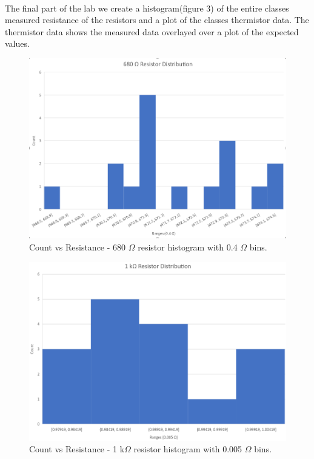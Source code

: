 \documentclass{article}
\begin{document}
\paragraph{}
The final part of the lab we create a histogram(figure 3) of the entire classes measured resistance of the resistors and a plot of the classes thermistor data. The thermistor data shows the measured data overlayed over a plot of the expected values.

\begin{figure}[H]
	\begin{center}
		\includegraphics[width=12cm]{680_histogram}
	\end{center}
	\caption{Count vs Resistance - 680 $\Omega$ resistor histogram with 0.4 $\Omega$ bins.}
\end{figure}

\begin{figure}[H]
	\begin{center}
		\includegraphics[width=12cm]{1k_resistor}
	\end{center}
	\caption{Count vs Resistance - 1 k$\Omega$ resistor histogram with 0.005 $\Omega$ bins.}
\end{figure}
\end{document}
